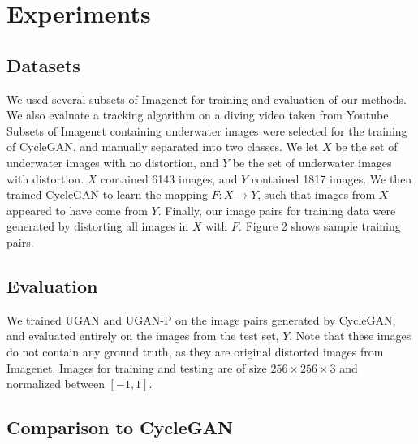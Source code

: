 \documentclass[conference,reqno]{IEEEtran}
\begin{document}
\section{Experiments}
\subsection{Datasets}
We used several subsets of Imagenet \cite{deng2009imagenet} for training and evaluation of our methods. We also
evaluate a tracking algorithm on a diving video taken from Youtube. Subsets of Imagenet containing underwater images
were selected for the training of CycleGAN, and manually separated into two classes. We let $X$ be the set of
underwater images with no distortion, and $Y$ be the set of underwater images with distortion. $X$ contained 6143
images, and $Y$ contained 1817 images. We then trained CycleGAN to learn the mapping $F: X \rightarrow Y$, such that
images from $X$ appeared to have come from $Y$. Finally, our image pairs for training data were generated by distorting
all images in $X$ with $F$. Figure 2 shows sample training pairs.

\subsection{Evaluation}
We trained UGAN and UGAN-P on the image pairs generated by CycleGAN, and evaluated entirely on the images from the
test set, $Y$. Note that these images do not contain any ground truth, as they are original distorted images from
Imagenet. Images for training and testing are of size $256 \times 256 \times 3$ and normalized between $[-1, 1]$.


\subsection{Comparison to CycleGAN}
\end{document}
